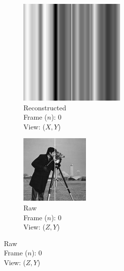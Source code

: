 \documentclass{osa-article}
\begin{document}
\begin{figure}
\begin{subfigure}[t]{0.2\linewidth}
    \includegraphics[width=\linewidth]{./figures/results/3D_python/no_drift_zelda/0/xy_recon}\caption{Reconstructed\\Frame (\(n\)): 0\\View: (\(X,Y\))}
  \end{subfigure}\hfill
  \begin{subfigure}[t]{0.2\linewidth}
    \centering
    \includegraphics[width=\linewidth]{./figures/results/3D_python/no_drift_zelda/0/zx}\caption{Raw\\Frame (\(n\)): 0\\View: (\(Z,Y\))}

\end{subfigure}
\end{figure}
\end{document}
